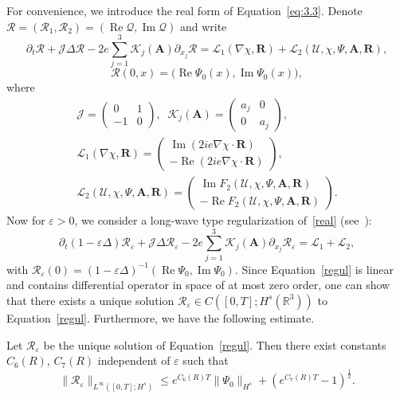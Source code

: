 \documentclass[AHL,Unicode,longabstracts]{cedram}
\newcommand{\BA}{\mathbf{A}}
\newcommand{\BR}{\mathbf{R}}
\newcommand{\R}{\mathbb{R}}
\DeclareMathOperator{\IM}{Im}
\DeclareMathOperator{\RE}{Re}
\begin{document}
For convenience, we introduce the real form of Equation~\eqref{eq:3.3}. Denote $\mathcal{R}=(\mathcal{R}_1,\mathcal{R}_2) =(\RE \mathcal{Q}, \IM\mathcal{Q})$ and write
\begin{equation}\label{real}
\partial_t \mathcal{R} + \mathcal{J} \Delta \mathcal{R} - 2e \sum_{j=1}^3 \mathcal{K}_j (\BA) \partial_{x_j} \mathcal{R} =\mathcal{L}_1 (\nabla \chi, \BR) +\mathcal{L}_2 (\mathcal{U}, \chi, \Psi, \BA, \BR),
\end{equation}
\[
\mathcal{R}(0,x)= \big(\RE \Psi_0(x),\IM\Psi_0(x) \big),
\]
where
\begin{gather*}
\mathcal{J} =
\begin{pmatrix}
0&1\\
-1&0
\end{pmatrix},
\;\; \mathcal{K}_j(\BA) =
\begin{pmatrix}
{a}_j&0\\
0&{a}_j
\end{pmatrix},
\\
\mathcal{L}_1 (\nabla\chi, \BR)=
\begin{pmatrix}
\IM(2ie \nabla \chi \cdot \BR) \\
-\RE (2ie \nabla \chi \cdot \BR)
\end{pmatrix},
\\
\mathcal{L}_2 (\mathcal{U}, \chi, \Psi, \BA, \BR) =
\begin{pmatrix}
\IM F_2(\mathcal{U}, \chi, \Psi, \BA, \BR) \\
-\RE F_2(\mathcal{U}, \chi, \Psi, \BA, \BR)
\end{pmatrix}.
\end{gather*}
Now for $\varepsilon>0$, we consider a long-wave type regularization of~\eqref{real} (see~\cite{CG}):
\begin{equation}\label{regul}
\partial_t (1-\varepsilon \Delta) \mathcal{R}_\varepsilon +\mathcal{J} \Delta \mathcal{R}_\varepsilon -2e \sum_{j=1}^3 \mathcal{K}_j(\BA) \partial_{x_j} \mathcal{R}_\varepsilon =\mathcal{L}_1+\mathcal{L}_2,
\end{equation}
with $\mathcal{R}_\varepsilon(0) =(1-\varepsilon \Delta)^{-1}(\RE \Psi_0,\IM\Psi_0)$. Since Equation~\eqref{regul} is linear and contains differential operator in space of at most zero order, one can show that there exists a unique solution $\mathcal{R}_\varepsilon \in C([0,T];H^s(\R^3))$ to Equation~\eqref{regul}. Furthermore, we have the following estimate.

\begin{lemm}\label{regul1}
Let $\mathcal{R}_\varepsilon$ be the unique solution of Equation~\eqref{regul}. Then there exist constants $C_6(R)$, $C_7(R)$ independent of $\varepsilon$ such that
\[
\| \mathcal{R}_\varepsilon \|_{L^\infty([0,T];H^s)}
\leq e^{C_6(R)T} \| \Psi_0 \|_{H^s} +\left(e^{C_7(R)T}-1 \right)^{\frac{1}{2}}.
\]
\end{lemm}
\end{document}
